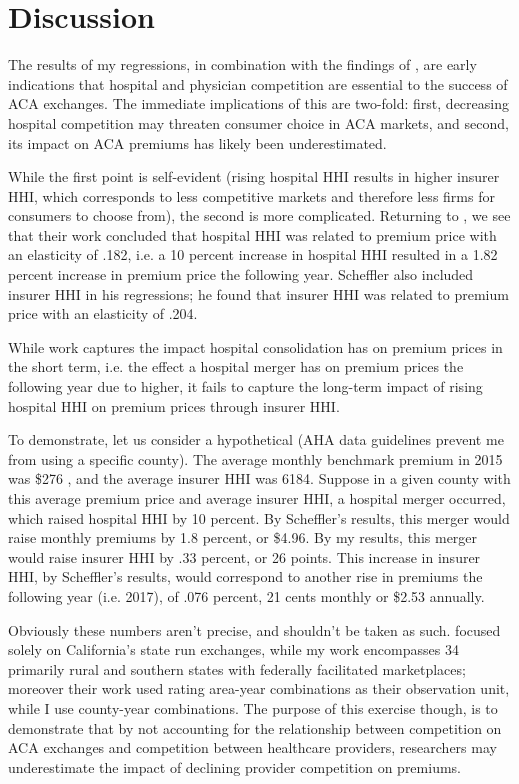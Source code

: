 \documentclass[12pt,letterpaper]{article}
\begin{document}
\section{Discussion}

The results of my regressions, in combination with the findings of \citet{morrisey_five-state_2017}, are early indications that hospital and physician competition are essential to the success of ACA exchanges. The immediate implications of this are two-fold: first, decreasing hospital competition may threaten consumer choice in ACA markets, and second, its impact on ACA premiums has likely been underestimated. 

While the first point is self-evident (rising hospital HHI results in higher insurer HHI, which corresponds to less competitive markets and therefore less firms for consumers to choose from), the second is more complicated. Returning to \citet{scheffler_consolidation_2018}, we see that their work concluded that hospital HHI was related to premium price with an elasticity of .182, i.e. a 10 percent increase in hospital HHI resulted in a 1.82 percent increase in premium price the following year. Scheffler also included insurer HHI in his regressions; he found that insurer HHI was related to premium price with an elasticity of .204. 

While \citet{scheffler_consolidation_2018} work captures the impact hospital consolidation has on premium prices in the short term, i.e. the effect a hospital merger has on premium prices the following year due to higher, it fails to capture the long-term impact of rising hospital HHI on premium prices through insurer HHI. 

To demonstrate, let us consider a hypothetical (AHA data guidelines prevent me from using a specific county). The average monthly benchmark premium in 2015 was \$276 \citep{cox_analysis_2015}, and the average insurer HHI was 6184. Suppose in a given county with this average premium price and average insurer HHI, a hospital merger occurred, which raised hospital HHI by 10 percent. By Scheffler's results, this merger would raise monthly premiums by 1.8 percent, or \$4.96. By my results, this merger would raise insurer HHI by .33 percent, or 26 points. This increase in insurer HHI, by Scheffler's results, would correspond to another rise in premiums the following year (i.e. 2017), of .076 percent, 21 cents monthly or \$2.53 annually.

Obviously these numbers aren't precise, and shouldn't be taken as such. \citet{scheffler_consolidation_2018} focused solely on California's state run exchanges, while my work encompasses 34 primarily rural and southern states with federally facilitated marketplaces; moreover their work used rating area-year combinations as their observation unit, while I use county-year combinations. The purpose of this exercise though, is to demonstrate that by not accounting for the relationship between competition on ACA exchanges and competition between healthcare providers, researchers may underestimate the impact of declining provider competition on premiums.
\end{document}
